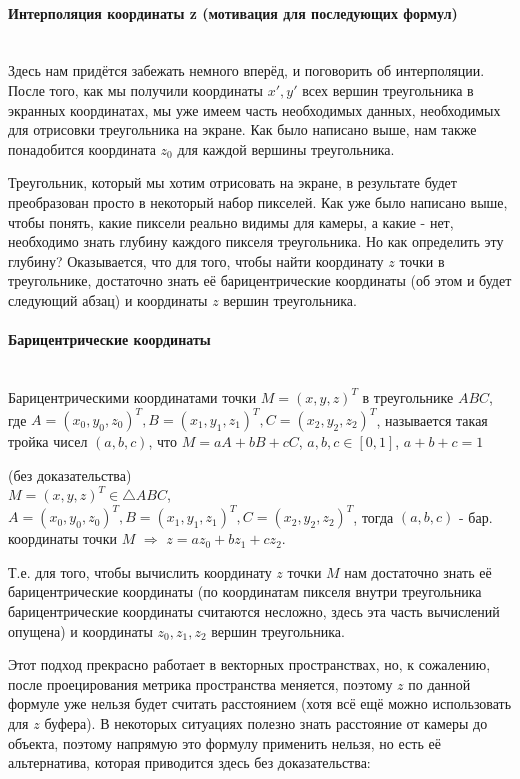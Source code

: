 \documentclass{article}
\begin{document}
\paragraph{Интерполяция координаты z (мотивация для последующих формул)}
$\text{}$\\
Здесь нам придётся забежать немного вперёд, и поговорить об интерполяции. После того, как мы получили координаты $x', y'$ всех вершин треугольника в экранных координатах, мы уже имеем часть необходимых данных, необходимых для отрисовки треугольника на экране. Как было написано выше, нам также понадобится координата $z_0$ для каждой вершины треугольника. 

Треугольник, который мы хотим отрисовать на экране, в результате будет преобразован просто в некоторый набор пикселей. Как уже было написано выше, чтобы понять, какие пиксели реально видимы для камеры, а какие - нет, необходимо знать глубину каждого пикселя треугольника. Но как определить эту глубину? Оказывается, что для того, чтобы найти координату $z$ точки в треугольнике, достаточно знать её барицентрические координаты (об этом и будет следующий абзац) и координаты $z$ вершин треугольника. 
\paragraph{Барицентрические координаты}
$\text{}$\\
 Барицентрическими координатами точки $M = (x, y, z)^T$ в треугольнике $ABC$, где $A=(x_0, y_0, z_0)^T, B=(x_1, y_1, z_1)^T, C=(x_2, y_2, z_2)^T$, называется такая тройка чисел $(a, b, c)$, что  $M=aA+bB+cC$, $a,b,c\in[0, 1]$, $a+b+c=1$ 
\begin{lemma}
(без доказательства) \\
$M = (x, y, z)^T \in \triangle ABC$, $A=(x_0, y_0, z_0)^T, B=(x_1, y_1, z_1)^T, C=(x_2, y_2, z_2)^T$, тогда $(a, b, c)$ - бар. координаты точки $M$ $\Rightarrow$  $z=a z_0 + b z_1 + c z_2$. 
\end{lemma}
Т.е. для того, чтобы вычислить координату $z$ точки $M$ нам достаточно знать её барицентрические координаты (по координатам пикселя внутри треугольника барицентрические координаты считаются несложно, здесь эта часть вычислений опущена) и координаты $z_0, z_1, z_2$ вершин треугольника.

Этот подход прекрасно работает в векторных пространствах, но, к сожалению, после проецирования метрика пространства меняется, поэтому $z$ по данной формуле уже нельзя будет считать расстоянием (хотя всё ещё можно использовать для $z$ буфера). В некоторых ситуациях полезно знать расстояние от камеры до объекта, поэтому напрямую это формулу применить нельзя, но есть её альтернатива, которая приводится здесь без доказательства: 
\end{document}
